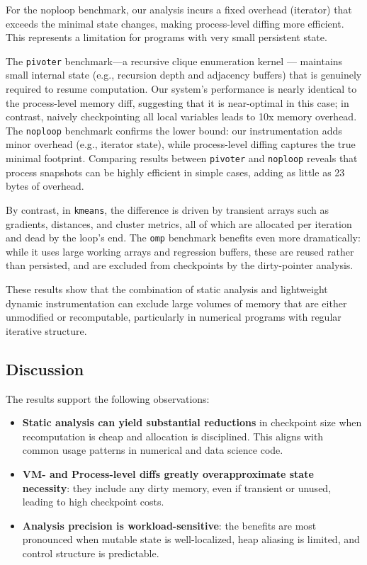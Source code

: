 For the noploop benchmark, our analysis incurs a fixed overhead (iterator) that exceeds 
the minimal state changes, making process-level diffing more efficient. This 
represents a limitation for programs with very small persistent state.

The \texttt{pivoter} benchmark---a recursive clique enumeration kernel --- maintains small internal state (e.g., recursion depth and adjacency buffers) that is genuinely required to resume computation. Our system’s performance is nearly identical to the process-level memory diff, suggesting that it is near-optimal in this case; in contrast, naively checkpointing all local variables leads to 10x memory overhead. The \texttt{noploop} benchmark confirms the lower bound: our instrumentation adds minor overhead (e.g., iterator state), while process-level diffing captures the true minimal footprint. Comparing \texttt{\PROCDIFF} results between \texttt{pivoter} and \texttt{noploop} reveals that process snapshots can be highly efficient in simple cases, adding as little as 23 bytes of overhead.

By contrast, in \texttt{kmeans}, the difference is driven by transient arrays such as gradients, distances, and cluster metrics, all of which are allocated per iteration and dead by the loop's end. The \texttt{omp} benchmark benefits even more dramatically: while it uses large working arrays and regression buffers, these are reused rather than persisted, and are excluded from checkpoints by the dirty-pointer analysis.

These results show that the combination of static analysis and lightweight dynamic instrumentation can exclude large volumes of memory that are either unmodified or recomputable, particularly in numerical programs with regular iterative structure.

\subsection{Discussion}

The results support the following observations:

\begin{itemize}
  \item \textbf{Static analysis can yield substantial reductions} in checkpoint size when recomputation is cheap and allocation is disciplined. This aligns with common usage patterns in numerical and data science code.
  \item \textbf{VM- and Process-level diffs greatly overapproximate state necessity}: they include any dirty memory, even if transient or unused, leading to high checkpoint costs.
  \item \textbf{Analysis precision is workload-sensitive}: the benefits are most pronounced when mutable state is well-localized, heap aliasing is limited, and control structure is predictable.
\end{itemize}

